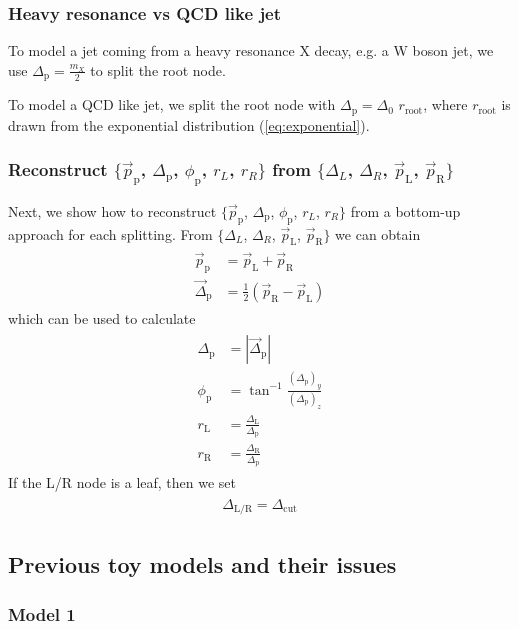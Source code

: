 \documentclass[12pt]{article}
\newcommand{\bea}{\begin{eqnarray}\begin{aligned}}
\newcommand{\eea}{\end{aligned}\end{eqnarray}}
\begin{document}
\subsubsection{Heavy resonance vs QCD like jet}

To model a jet coming from a heavy resonance X decay, e.g. a W boson jet, we use $\Delta_{\text{p}} =  \frac{m_X}{2}$ to split the root node.

To model a QCD like jet, we split the root node with $\Delta_{\text{p}} = \Delta_0 \,\, r_{\text{root}}$, where $r_{\text{root}}$ is drawn from the exponential distribution (\ref{eq:exponential}).

\subsubsection{Reconstruct $\{\vec{p}_\text{p}$, $\Delta_{\text{p}}$, $\phi_{\text{p}}$, $r_L$, $r_R\}$ from  $\{\Delta_L$, $\Delta_R$, $\vec{p}_\text{L}$, $ \vec{p}_\text{R}\}$ }

Next, we show how to reconstruct $\{\vec{p}_\text{p}$, $\Delta_{\text{p}}$, $\phi_{\text{p}}$, $r_L$, $r_R\}$ from a bottom-up approach for each splitting. From  $\{\Delta_L$, $\Delta_R$, $\vec{p}_\text{L}$, $ \vec{p}_\text{R}\}$ we can obtain
\bea
\vec{p}_\text{p} &= \vec{p}_\text{L}+ \vec{p}_\text{R}\\
\vec{\Delta}_\text{p} &= \frac{1}{2} (\vec{p}_\text{R} - \vec{p}_\text{L})
\eea
which can be used to calculate
\bea
\Delta_\text{p} &= | \vec{ \Delta}_\text{p} |\\
\phi_{\text{p}} &=\tan^{-1}\frac{(\Delta_\text{p})_y}{(\Delta_\text{p})_z}\\
r_{\text{L}} &=\frac{\Delta_{\text{L}}}{\Delta_{\text{p}}}\\
r_{\text{R}} &=\frac{\Delta_{\text{R}}}{\Delta_{\text{p}}}
\eea
If the L/R node is a leaf, then we set
\bea
\Delta_{\text{L/R}}=\Delta_{\text{cut}}
\eea









\subsection{Previous toy models and their issues}


\subsubsection{Model 1}
\end{document}
